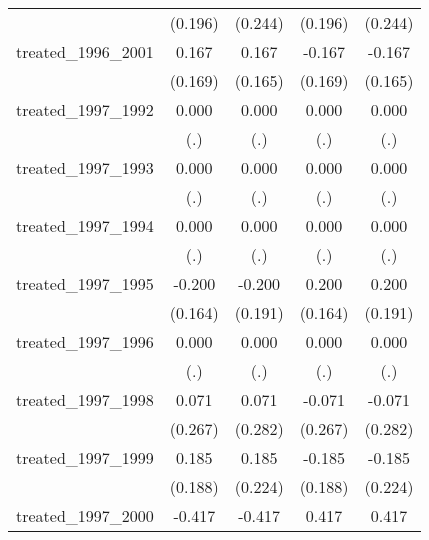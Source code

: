 {\begin{tabular}{l*{4}{c}}
            &     (0.196)         &     (0.244)         &     (0.196)         &     (0.244)         \\
[1em]
treated\_1996\_2001&       0.167         &       0.167         &      -0.167         &      -0.167         \\
            &     (0.169)         &     (0.165)         &     (0.169)         &     (0.165)         \\
[1em]
treated\_1997\_1992&       0.000         &       0.000         &       0.000         &       0.000         \\
            &         (.)         &         (.)         &         (.)         &         (.)         \\
[1em]
treated\_1997\_1993&       0.000         &       0.000         &       0.000         &       0.000         \\
            &         (.)         &         (.)         &         (.)         &         (.)         \\
[1em]
treated\_1997\_1994&       0.000         &       0.000         &       0.000         &       0.000         \\
            &         (.)         &         (.)         &         (.)         &         (.)         \\
[1em]
treated\_1997\_1995&      -0.200         &      -0.200         &       0.200         &       0.200         \\
            &     (0.164)         &     (0.191)         &     (0.164)         &     (0.191)         \\
[1em]
treated\_1997\_1996&       0.000         &       0.000         &       0.000         &       0.000         \\
            &         (.)         &         (.)         &         (.)         &         (.)         \\
[1em]
treated\_1997\_1998&       0.071         &       0.071         &      -0.071         &      -0.071         \\
            &     (0.267)         &     (0.282)         &     (0.267)         &     (0.282)         \\
[1em]
treated\_1997\_1999&       0.185         &       0.185         &      -0.185         &      -0.185         \\
            &     (0.188)         &     (0.224)         &     (0.188)         &     (0.224)         \\
[1em]
treated\_1997\_2000&      -0.417         &      -0.417         &       0.417         &       0.417         \\

\end{tabular}}
